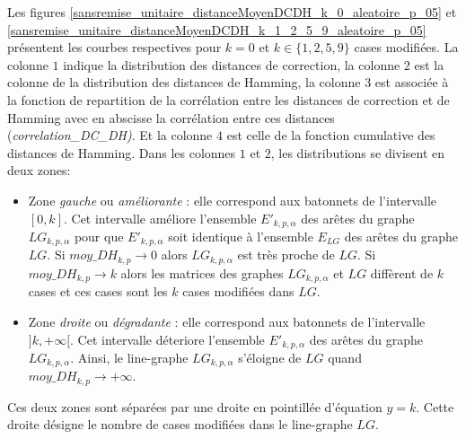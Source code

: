 Les figures \ref{sansremise_unitaire_distanceMoyenDCDH_k_0_aleatoire_p_05} et \ref{sansremise_unitaire_distanceMoyenDCDH_k_1_2_5_9_aleatoire_p_05} pr\'esentent les courbes respectives pour $k=0$ et $k \in \{1,2,5,9\}$ cases modifi\'ees. 
La colonne $1$ indique la distribution des distances de correction, la colonne $2$ est la colonne de la distribution des distances de Hamming, la colonne $3$ est associ\'ee \`a la fonction de repartition de la corr\'elation entre les distances de correction et de Hamming avec en abscisse la corr\'elation entre ces distances ({\em correlation\_DC\_DH)}. 
Et la colonne $4$ est celle de la fonction cumulative des distances de Hamming.
Dans les colonnes $1$ et $2$, les distributions se divisent en deux zones: 
\begin{itemize}
\item Zone {\em gauche} ou {\em am\'eliorante} : elle correspond aux batonnets de l'intervalle $[0,k]$. Cet intervalle  am\'eliore l'ensemble $E'_{k,p,\alpha}$ des ar\^etes du graphe $LG_{k,p,\alpha}$ pour que $E'_{k,p,\alpha}$ soit identique \`a l'ensemble $E_{LG}$ des ar\^etes du graphe $LG$. Si $moy\_DH_{k,p} \rightarrow 0$ alors $LG_{k,p,\alpha}$ est tr\`es proche de $LG$. Si $moy\_DH_{k,p} \rightarrow k$ alors les matrices des graphes $LG_{k,p,\alpha}$ et $LG$ diff\`erent de $k$ cases et ces cases sont les $k$ cases modifi\'ees dans $LG$.
\item Zone {\em droite} ou {\em d\'egradante} : elle correspond aux batonnets de l'intervalle $]k, +\infty[$. Cet intervalle d\'eteriore  l'ensemble $E'_{k,p,\alpha}$ des ar\^etes du graphe $LG_{k,p,\alpha}$. Ainsi, le line-graphe $LG_{k,p,\alpha}$ s'\'eloigne de $LG$ quand $moy\_DH_{k,p} \rightarrow +\infty$.
\end{itemize}
Ces deux zones sont s\'epar\'ees par une droite en pointill\'ee d'\'equation $y = k$.  Cette droite d\'esigne le nombre de cases modifi\'ees dans le line-graphe $LG$.
\newline

